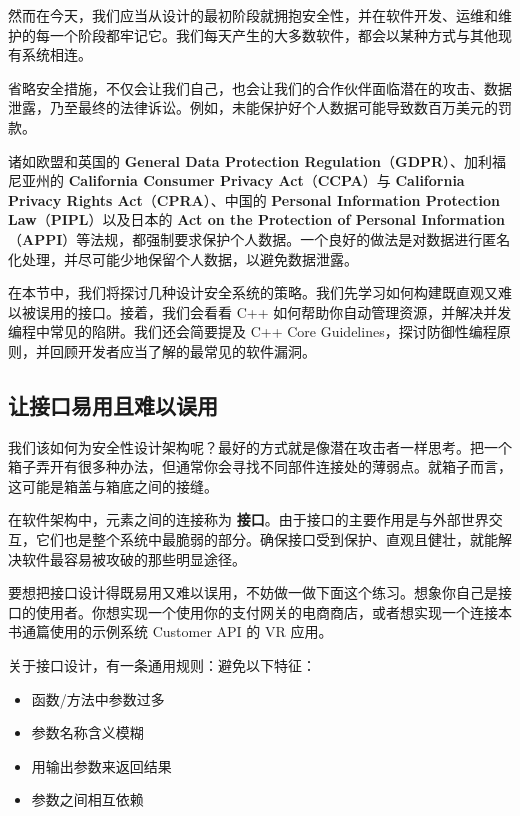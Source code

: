 然而在今天，我们应当从设计的最初阶段就拥抱安全性，并在软件开发、运维和维护的每一个阶段都牢记它。我们每天产生的大多数软件，都会以某种方式与其他现有系统相连。

省略安全措施，不仅会让我们自己，也会让我们的合作伙伴面临潜在的攻击、数据泄露，乃至最终的法律诉讼。例如，未能保护好个人数据可能导致数百万美元的罚款。

\label{idx:990}
\label{idx:991}
\label{idx:992}
\label{idx:993}
\label{idx:994}
\label{idx:995}
诸如欧盟和英国的 \textbf{General Data Protection Regulation}（\textbf{GDPR}）、加利福尼亚州的 \textbf{California Consumer Privacy Act}（\textbf{CCPA}）与 \textbf{California Privacy Rights Act}（\textbf{CPRA}）、中国的 \textbf{Personal Information Protection Law}（\textbf{PIPL}）以及日本的 \textbf{Act on the Protection of Personal Information}（\textbf{APPI}）等法规，都强制要求保护个人数据。一个良好的做法是对数据进行匿名化处理，并尽可能少地保留个人数据，以避免数据泄露。

在本节中，我们将探讨几种设计安全系统的策略。我们先学习如何构建既直观又难以被误用的接口。接着，我们会看看 C++ 如何帮助你自动管理资源，并解决并发编程中常见的陷阱。我们还会简要提及 C++ Core Guidelines，探讨防御性编程原则，并回顾开发者应当了解的最常见的软件漏洞。

\subsection{让接口易用且难以误用}

我们该如何为安全性设计架构呢？最好的方式就是像潜在攻击者一样思考。把一个箱子弄开有很多种办法，但通常你会寻找不同部件连接处的薄弱点。就箱子而言，这可能是箱盖与箱底之间的接缝。

\label{idx:996}
\label{idx:997}
在软件架构中，元素之间的连接称为 \textbf{接口}。由于接口的主要作用是与外部世界交互，它们也是整个系统中最脆弱的部分。确保接口受到保护、直观且健壮，就能解决软件最容易被攻破的那些明显途径。

要想把接口设计得既易用又难以误用，不妨做一做下面这个练习。想象你自己是接口的使用者。你想实现一个使用你的支付网关的电商商店，或者想实现一个连接本书通篇使用的示例系统 Customer API 的 VR 应用。

关于接口设计，有一条通用规则：避免以下特征：

\begin{itemize}
\item 函数/方法中参数过多
\item 参数名称含义模糊
\item 用输出参数来返回结果
\item 参数之间相互依赖
\end{itemize}

